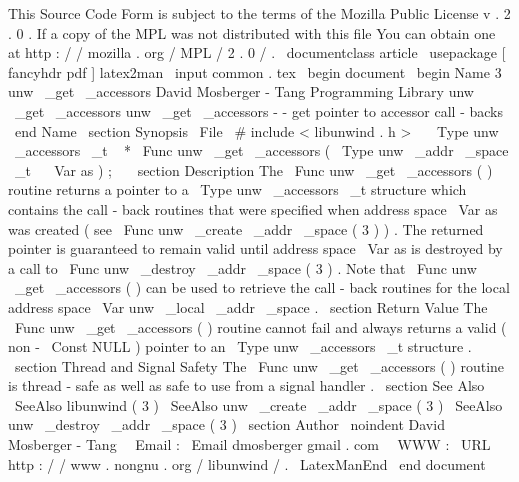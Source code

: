 %
This
Source
Code
Form
is
subject
to
the
terms
of
the
Mozilla
Public
%
License
v
.
2
.
0
.
If
a
copy
of
the
MPL
was
not
distributed
with
this
%
file
You
can
obtain
one
at
http
:
/
/
mozilla
.
org
/
MPL
/
2
.
0
/
.
\
documentclass
{
article
}
\
usepackage
[
fancyhdr
pdf
]
{
latex2man
}
\
input
{
common
.
tex
}
\
begin
{
document
}
\
begin
{
Name
}
{
3
}
{
unw
\
_get
\
_accessors
}
{
David
Mosberger
-
Tang
}
{
Programming
Library
}
{
unw
\
_get
\
_accessors
}
unw
\
_get
\
_accessors
-
-
get
pointer
to
accessor
call
-
backs
\
end
{
Name
}
\
section
{
Synopsis
}
\
File
{
\
#
include
<
libunwind
.
h
>
}
\
\
\
Type
{
unw
\
_accessors
\
_t
~
*
}
\
Func
{
unw
\
_get
\
_accessors
}
(
\
Type
{
unw
\
_addr
\
_space
\
_t
~
}
\
Var
{
as
}
)
;
\
\
\
section
{
Description
}
The
\
Func
{
unw
\
_get
\
_accessors
}
(
)
routine
returns
a
pointer
to
a
\
Type
{
unw
\
_accessors
\
_t
}
structure
which
contains
the
call
-
back
routines
that
were
specified
when
address
space
\
Var
{
as
}
was
created
(
see
\
Func
{
unw
\
_create
\
_addr
\
_space
}
(
3
)
)
.
The
returned
pointer
is
guaranteed
to
remain
valid
until
address
space
\
Var
{
as
}
is
destroyed
by
a
call
to
\
Func
{
unw
\
_destroy
\
_addr
\
_space
}
(
3
)
.
Note
that
\
Func
{
unw
\
_get
\
_accessors
}
(
)
can
be
used
to
retrieve
the
call
-
back
routines
for
the
local
address
space
\
Var
{
unw
\
_local
\
_addr
\
_space
}
.
\
section
{
Return
Value
}
The
\
Func
{
unw
\
_get
\
_accessors
}
(
)
routine
cannot
fail
and
always
returns
a
valid
(
non
-
\
Const
{
NULL
}
)
pointer
to
an
\
Type
{
unw
\
_accessors
\
_t
}
structure
.
\
section
{
Thread
and
Signal
Safety
}
The
\
Func
{
unw
\
_get
\
_accessors
}
(
)
routine
is
thread
-
safe
as
well
as
safe
to
use
from
a
signal
handler
.
\
section
{
See
Also
}
\
SeeAlso
{
libunwind
(
3
)
}
\
SeeAlso
{
unw
\
_create
\
_addr
\
_space
(
3
)
}
\
SeeAlso
{
unw
\
_destroy
\
_addr
\
_space
(
3
)
}
\
section
{
Author
}
\
noindent
David
Mosberger
-
Tang
\
\
Email
:
\
Email
{
dmosberger
gmail
.
com
}
\
\
WWW
:
\
URL
{
http
:
/
/
www
.
nongnu
.
org
/
libunwind
/
}
.
\
LatexManEnd
\
end
{
document
}
